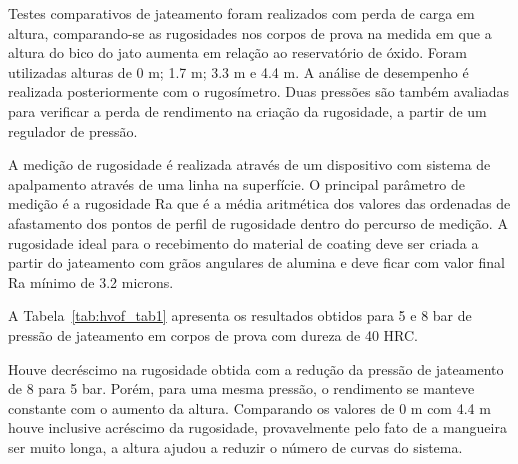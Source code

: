 Testes comparativos de jateamento foram realizados com perda de carga em
altura, comparando-se as rugosidades nos corpos de prova na medida em
que a altura do bico do jato aumenta em relação ao reservatório de óxido. Foram
utilizadas alturas de 0 m; 1.7 m; 3.3 m e 4.4 m. A análise de desempenho é
realizada posteriormente com o rugosímetro. Duas pressões são também avaliadas
para verificar a perda de rendimento na criação da rugosidade, a partir de um
regulador de pressão.

A medição de rugosidade é realizada através de um dispositivo com sistema de
apalpamento através de uma linha na superfície. O principal parâmetro de
medição é a rugosidade Ra que é a média aritmética dos valores das ordenadas de
afastamento dos pontos de perfil de rugosidade dentro do percurso de medição. A
rugosidade ideal para o recebimento do material de coating deve ser criada a
partir do jateamento com grãos angulares de alumina e deve ficar com valor
final Ra mínimo de 3.2 microns.

A Tabela~\ref{tab:hvof_tab1} apresenta os resultados obtidos para 5 e
8 bar de pressão de jateamento em corpos de prova com dureza de 40 HRC.

Houve decréscimo na rugosidade obtida com a redução da pressão de jateamento de
8 para 5 bar. Porém, para uma mesma pressão, o rendimento se manteve constante
com o aumento da altura. Comparando os valores de 0 m com 4.4 m houve inclusive
acréscimo da rugosidade, provavelmente pelo fato de a mangueira ser muito
longa, a altura ajudou a reduzir o número de curvas do sistema.

